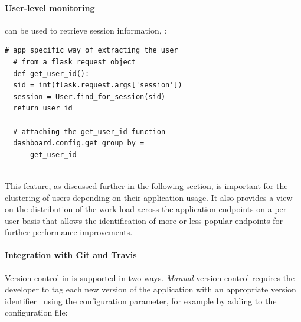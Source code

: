\documentclass{sig-alternate-05-2015}
\begin{document}
  \paragraph{User-level monitoring}
  

   can be used to retrieve session information, : 
  
  \begin{lstlisting}[style=custompython]  
  # app specific way of extracting the user
  # from a flask request object    
  def get_user_id():
  sid = int(flask.request.args['session'])
  session = User.find_for_session(sid)
  return user_id
  
  # attaching the get_user_id function
  dashboard.config.get_group_by = 
      get_user_id
  
  \end{lstlisting}
  This feature, as discussed further in the following section, is important for the clustering of users depending on their application usage. It also provides a view on the distribution of the work load across the application endpoints on a per user basis that allows the identification of more or less popular endpoints for further performance improvements. 
  
  \paragraph{Integration with Git and Travis}
  
  Version control in \tool is supported in two ways. \textit{Manual} version control requires the developer to tag each new version of the application with an appropriate version identifier~\cite{papazoglou2011managing} using the  configuration parameter, for example by adding to the configuration file:
  
\end{document}
